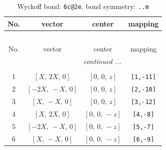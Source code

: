 \documentclass[fleqn,8pt]{jsarticle}
\begin{document}
\renewcommand{\arraystretch}{1.2}
\begin{longtable}{cccc}
\caption{Wyckoff bond: {\tt 6c@2e}, bond symmetry: {\tt ..m}}
 \\
 \hline \hline
No. & vector & center & mapping \\ \hline \endfirsthead

\multicolumn{3}{l}{\tablename\ \thetable{}} \\
 \hline \hline
No. & vector & center & mapping \\ \hline \endhead

 \hline \hline
\multicolumn{3}{r}{\footnotesize\it continued ...} \\ \endfoot

 \hline \hline
\multicolumn{3}{r}{} \\ \endlastfoot

1 & $\left[ X,\, 2 X,\, 0 \right]$ & $\left[ 0,\, 0,\, z \right]$ & {\tt [1,-11]} \\ \hline
2 & $\left[ - 2 X,\, - X,\, 0 \right]$ & $\left[ 0,\, 0,\, z \right]$ & {\tt [2,-10]} \\ \hline
3 & $\left[ X,\, - X,\, 0 \right]$ & $\left[ 0,\, 0,\, z \right]$ & {\tt [3,-12]} \\ \hline
4 & $\left[ X,\, 2 X,\, 0 \right]$ & $\left[ 0,\, 0,\, - z \right]$ & {\tt [4,-8]} \\ \hline
5 & $\left[ - 2 X,\, - X,\, 0 \right]$ & $\left[ 0,\, 0,\, - z \right]$ & {\tt [5,-7]} \\ \hline
6 & $\left[ X,\, - X,\, 0 \right]$ & $\left[ 0,\, 0,\, - z \right]$ & {\tt [6,-9]} \\
\end{longtable}
\renewcommand{\arraystretch}{1.2}
\end{document}

